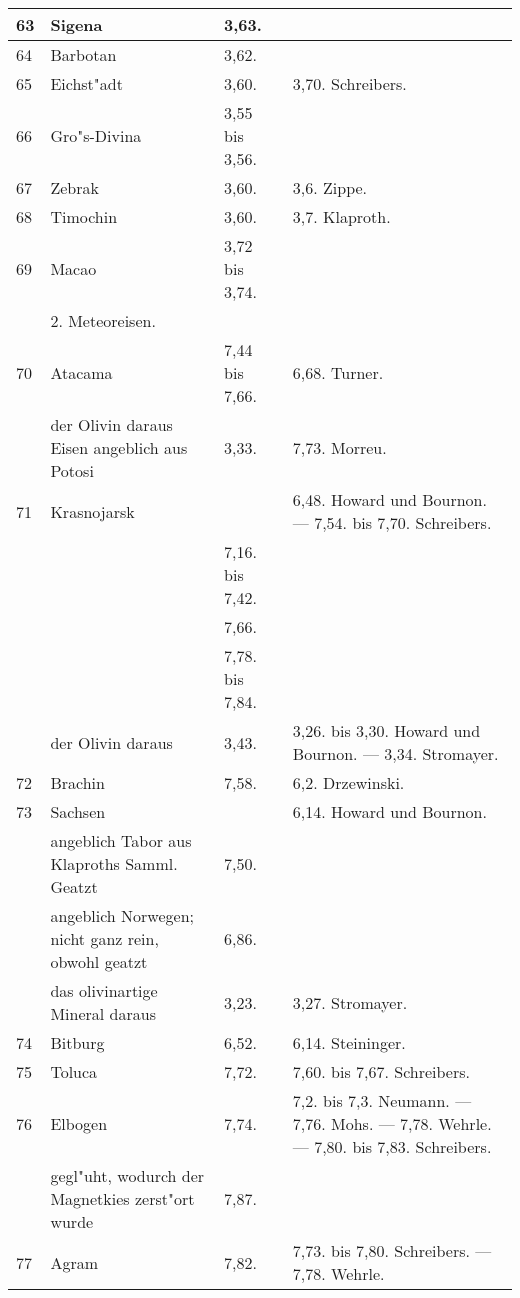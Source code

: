 \documentclass[a4paper, 11pt, oneside, polutonikogreek, german]{article}
\begin{document}
\begin{center}
\begin{longtable}{|p{7mm}|p{32mm}|p{30mm}|p{30mm}|}
        63 & Sigena & 3,63. &   \\ \hline
        64 & Barbotan & 3,62. &   \\ \hline
        65 & Eichst"adt & 3,60. & 3,70. Schreibers. \\ \hline
        66 & Gro"s-Divina & 3,55 bis 3,56. &   \\ \hline
        67 & Zebrak & 3,60. & 3,6. Zippe. \\ \hline
        68 & Timochin & 3,60. & 3,7. Klaproth. \\ \hline
        69 & Macao & 3,72 bis 3,74. &   \\ \hline
          & 2. Meteoreisen. &   &   \\ \hline
        70 & Atacama & 7,44 bis 7,66. & 6,68. Turner. \\ \hline
          & der Olivin daraus Eisen angeblich aus Potosi & 3,33. & 7,73. Morreu. \\ \hline
        71 & Krasnojarsk &   & 6,48. Howard und Bournon. --- 7,54. bis 7,70. Schreibers. \\ \hline
         ~ &   & 7,16. bis 7,42. &   \\ \hline
         ~ &   & 7,66. &   \\ \hline
         ~ &   & 7,78. bis 7,84. &   \\ \hline
        ~ & der Olivin daraus & 3,43. & 3,26. bis 3,30. Howard und Bournon. --- 3,34. Stromayer. \\ \hline
        72 & Brachin & 7,58. & 6,2. Drzewinski. \\ \hline
        73 & Sachsen &   & 6,14. Howard und Bournon. \\ \hline
         ~ & angeblich Tabor aus Klaproths Samml. Geatzt & 7,50. &   \\ \hline
         ~ & angeblich Norwegen; nicht ganz rein, obwohl geatzt & 6,86. &   \\ \hline
        ~  & das olivinartige Mineral daraus & 3,23. & 3,27. Stromayer. \\ \hline
        74 & Bitburg & 6,52. & 6,14. Steininger. \\ \hline
        75 & Toluca & 7,72. & 7,60. bis 7,67. Schreibers. \\ \hline
        76 & Elbogen & 7,74. & 7,2. bis 7,3. Neumann. --- 7,76. Mohs. --- 7,78. Wehrle. --- 7,80. bis 7,83. Schreibers. \\ \hline
         ~ & gegl"uht, wodurch der Magnetkies zerst"ort wurde & 7,87. & ~  \\ \hline
        77 & Agram & 7,82. & 7,73. bis 7,80. Schreibers. --- 7,78. Wehrle. \\ \hline

\end{longtable}
\end{center}
\end{document}

